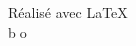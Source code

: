 \documentclass[a4paper,12pt,openright]{memoir}
\begin{document}


\vfill




\begin{center}
\baselineskip=60pt 

\vspace*{12.5cm}
Réalisé avec \LaTeX
\\
\vspace*{1.5cm}
{\lb \LARGE \textcircled {bo}}

\end{center}
\end{document}
